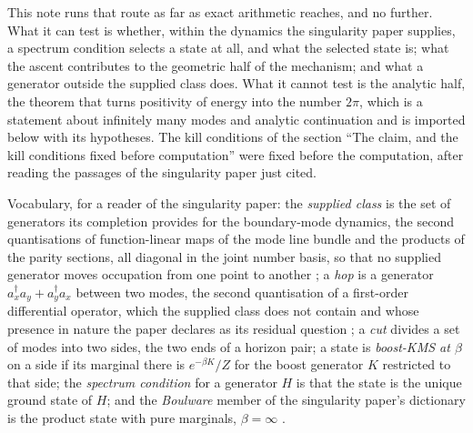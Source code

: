 \documentclass[11pt]{article}
\theoremstyle{definition}
\theoremstyle{plain}
\begin{document}
This note runs that route as far as exact arithmetic reaches, and no further. What it can test is whether, within the dynamics the singularity paper supplies, a spectrum condition selects a state at all, and what the selected state is; what the ascent contributes to the geometric half of the mechanism; and what a generator outside the supplied class does. What it cannot test is the analytic half, the theorem that turns positivity of energy into the number $2\pi$, which is a statement about infinitely many modes and analytic continuation and is imported below with its hypotheses. The kill conditions of the section ``The claim, and the kill conditions fixed before computation'' were fixed before the computation, after reading the passages of the singularity paper just cited.

Vocabulary, for a reader of the singularity paper: the \emph{supplied class} is the set of generators its completion provides for the boundary-mode dynamics, the second quantisations of function-linear maps of the mode line bundle and the products of the parity sections, all diagonal in the joint number basis, so that no supplied generator moves occupation from one point to another \cite[Prem.~7.30, Thm.~C.8]{ButlerT5}; a \emph{hop} is a generator $a^{\dagger}_{x}a_{y} + a^{\dagger}_{y}a_{x}$ between two modes, the second quantisation of a first-order differential operator, which the supplied class does not contain and whose presence in nature the paper declares as its residual question \cite[Rem.~7.33(b), Rem.~C.9]{ButlerT5}; a \emph{cut} divides a set of modes into two sides, the two ends of a horizon pair; a state is \emph{boost-KMS at $\beta$} on a side if its marginal there is $e^{-\beta K}/Z$ for the boost generator $K$ restricted to that side; the \emph{spectrum condition} for a generator $H$ is that the state is the unique ground state of $H$; and the \emph{Boulware} member of the singularity paper's dictionary is the product state with pure marginals, $\beta = \infty$ \cite[Rem.~7.26]{ButlerT5}.
\end{document}
